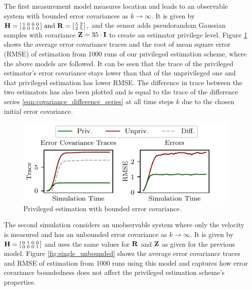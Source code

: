 \documentclass[letterpaper, 10 pt, conference]{ieeeconf}
\begin{document}
The first measurement model measures location and leads to an observable system with bounded error covariances as $k \rightarrow \infty$. It is given by 
$
   {{\mathbf{H}}}=
   \begin{bsmallmatrix}
      1 & 0 & 0 & 0\\
      0 & 0 & 1 & 0
   \end{bsmallmatrix}
   \text{ and }
   {\ensuremath{{\mathbf{R}}}}=
   \begin{bsmallmatrix}
      5 & 2\\
      2 & 5
   \end{bsmallmatrix}\,,
$ 
and the sensor adds pseudorandom Gaussian samples with covariance ${{\mathbf{Z}}}=35 \cdot {\ensuremath{{\mathbf{I}}}}$ to create an estimator privilege level. Figure \ref{fig:single_bounded} shows the average error covariance traces and the root of mean square error (RMSE) of estimation from 1000 runs of our privileged estimation scheme, where the above models are followed. It can be seen that the trace of the privileged estimator's error covariance stays lower than that of the unprivileged one and that privileged estimation has lower RMSE. The difference in trace between the two estimators has also been plotted and is equal to the trace of the difference series \eqref{eqn:covariance_difference_series} at all time steps $k$ due to the chosen initial error covariance.

\begin{figure}[htbp]
   \centering
   \includegraphics{pictures/single_level_bounded.pdf}
   \caption{Privileged estimation with bounded error covariance.}
   \label{fig:single_bounded}
\end{figure}

The second simulation considers an unobservable system where only the velocity is measured and has an unbounded error covariance as $k \rightarrow \infty$. It is given by 
$
   {{\mathbf{H}}}=
   \begin{bsmallmatrix}
      0 & 1 & 0 & 0\\
      0 & 0 & 0 & 1
   \end{bsmallmatrix}
$ 
and uses the same values for ${{\mathbf{R}}}$ and ${{\mathbf{Z}}}$ as given for the previous model. Figure \ref{fig:single_unbounded} shows the average error covariance traces and RMSE of estimation from 1000 runs using this model and captures how error covariance boundedness does not affect the privileged estimation scheme's properties.
\end{document}
